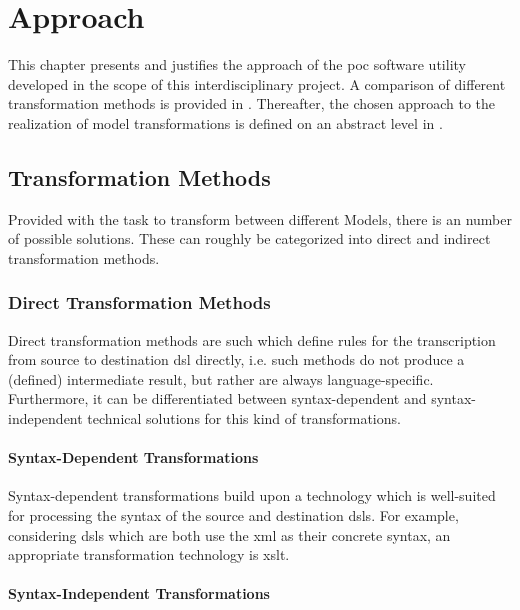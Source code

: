 \chapter{Approach}
\label{chap:approach}

This chapter presents and justifies the approach of the \gls{poc} software utility developed in the scope of this interdisciplinary project. A comparison of different transformation methods is provided in . Thereafter, the chosen approach to the realization of model transformations is defined on an abstract level in .

\section{Transformation Methods}
\label{sec:approach:transform}

Provided with the task to transform between different Models, there is an number of possible solutions. These can roughly be categorized into direct and indirect transformation methods.

\subsection{Direct Transformation Methods}

Direct transformation methods are such which define rules for the transcription from source to destination \gls{dsl} directly, i.e. such methods do not produce a (defined) intermediate result, but rather are always language-specific. Furthermore, it can be differentiated between syntax-dependent and syntax-independent technical solutions for this kind of transformations.

\subsubsection{Syntax-Dependent Transformations}

Syntax-dependent transformations build upon a technology which is well-suited for processing the syntax of the source and destination \glspl{dsl}. For example, considering \glspl{dsl} which are both use the \gls{xml}\cite{ref:xml} as their concrete syntax, an appropriate transformation technology is \gls{xslt}\cite{ref:xslt}.

\subsubsection{Syntax-Independent Transformations}

